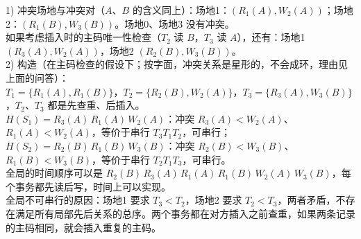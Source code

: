 \documentclass[10pt,a4paper]{article}
\begin{document}
\begin{ans}[2020 年第 5 题]
1) 冲突场地与冲突对（$A$、$B$ 的含义同上）：场地1：$(R_1(A),W_2(A))$；场地2：$(R_1(B),W_3(B))$。场地0、场地3 没有冲突。\\
\hspace*{1em}如果考虑插入时的主码唯一性检查（$T_2$ 读 $B$，$T_3$ 读 $A$），还有：场地1 $(R_3(A),W_2(A))$，场地2 $(R_2(B),W_3(B))$。\\
2) 构造（在主码检查的假设下；按字面，冲突关系是星形的，不会成环，理由见上面的问答）：\\
\hspace*{1em}$T_1=\{R_1(A),R_1(B)\}$，$T_2=\{R_2(B),W_2(A)\}$，$T_3=\{R_3(A),W_3(B)\}$，$T_2$、$T_3$ 都是先查重、后插入。\\
\hspace*{1em}$H(S_1)=R_3(A)\,R_1(A)\,W_2(A)$：冲突 $R_3(A)<W_2(A)$、$R_1(A)<W_2(A)$，等价于串行 $T_3T_1T_2$，可串行；\\
\hspace*{1em}$H(S_2)=R_2(B)\,R_1(B)\,W_3(B)$：冲突 $R_2(B)<W_3(B)$、$R_1(B)<W_3(B)$，等价于串行 $T_2T_1T_3$，可串行。\\
\hspace*{1em}全局的时间顺序可以是 $R_2(B)\,R_3(A)\,R_1(A)\,R_1(B)\,W_2(A)\,W_3(B)$，每个事务都先读后写，时间上可以实现。\\
\hspace*{1em}全局不可串行的原因：场地1 要求 $T_3<T_2$，场地2 要求 $T_2<T_3$，两者矛盾，不存在满足所有局部先后关系的总序。两个事务都在对方插入之前查重，如果两条记录的主码相同，就会插入重复的主码。
\end{ans}
\end{document}
